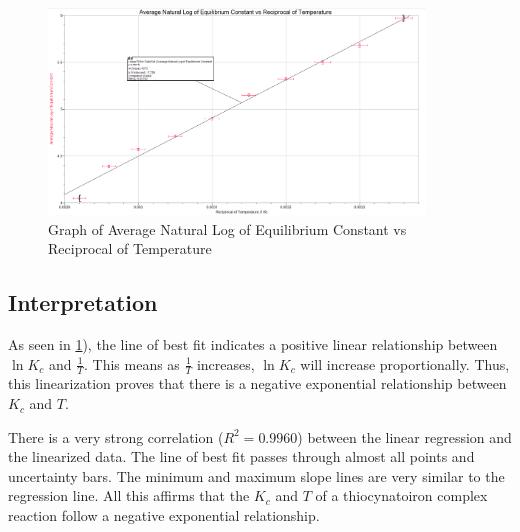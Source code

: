 \begin{figure}[H]
    \centering
    \captionsetup{justification=centering,margin=1.5cm}
    \includegraphics[width=100mm,height=\textheight,keepaspectratio]{images/after_linearization.png}
    \caption{Graph of Average Natural Log of Equilibrium Constant vs Reciprocal of Temperature}
    \label{fig:after_linearization}
\end{figure}




\subsection{Interpretation}
As seen in \cref{fig:after_linearization}), the line of best fit indicates a positive linear relationship between \(\ln K_c\) and \(\frac{1}{T}\). This means as \(\frac{1}{T}\) increases, \(\ln{K_c}\) will increase proportionally. Thus, this linearization proves that there is a negative exponential relationship between \(K_c\) and \(T\).

There is a very strong correlation (\(R^2=0.9960\)) between the linear regression and the linearized data. The line of best fit passes through almost all points and uncertainty bars. The minimum and maximum slope lines are very similar to the regression line. All this affirms that the \(K_c\) and \(T\) of a thiocynatoiron complex reaction follow a negative exponential relationship.

